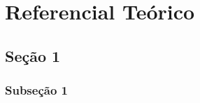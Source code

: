 \chapter{Referencial Teórico}


\section{Se\c c\~ao 1}
\cite{lauwens2019think}

\subsection{Subse\c c\~ao 1}

